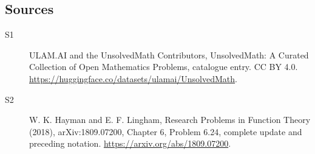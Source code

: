 \documentclass[11pt]{article}
\begin{document}
\subsection{Sources}
\begin{description}
\item[\hypertarget{source:statement:1}{S1}] ULAM.AI and the UnsolvedMath Contributors, UnsolvedMath: A Curated Collection of Open Mathematics Problems, catalogue entry. CC BY 4.0. \url{https://huggingface.co/datasets/ulamai/UnsolvedMath}.
\item[\hypertarget{source:statement:2}{S2}] W. K. Hayman and E. F. Lingham, Research Problems in Function Theory (2018), arXiv:1809.07200, Chapter 6, Problem 6.24, complete update and preceding notation. \url{https://arxiv.org/abs/1809.07200}.
\end{description}
\label{end:statement}
\end{document}
